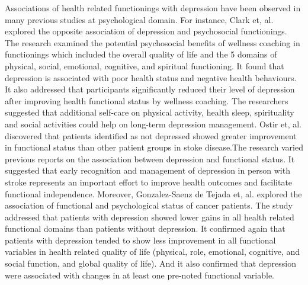 \documentclass[12pt]{article}
\begin{document}
Associations of health related functionings with depression have been observed in many previous studies at psychological domain. For instance, Clark et, al. \cite{Clark} explored the opposite association of depression and psychosocial functionings. The research examined the potential psychosocial benefits of wellness coaching in functionings which included the overall quality of life and the 5 domains of physical, social, emotional, cognitive, and spiritual functioning. It found that depression is associated with poor health status and negative health behaviours. It also addressed that participants significantly reduced their level of depression after improving health functional status by wellness coaching. The researchers suggested that additional self-care on physical activity, health sleep, spirituality and social activities could help on long-term depression management. Ostir et, al. \cite{Ostir} discovered that patients identified as not depressed showed greater improvement in functional status than other patient groups in stoke disease.The research varied previous reports on the association between depression and functional status. It suggested that early recognition and management of depression in person with stroke represents an important effort to improve health outcomes and facilitate functional independence. Moreover, Gonzalez-Saenz de Tejada et, al. \cite{Gonzalez-Saenz} explored the association of functional and psychological status of cancer patients. The study addressed that patients with depression showed lower gains in all health related functional domains than patients without depression. It confirmed again that patients with depression tended to show less improvement in all functional variables in health related quality of life (physical, role, emotional, cognitive, and social function, and global quality of life). And it also confirmed that depression were associated with changes in at least one pre-noted functional variable.
\\
\end{document}
